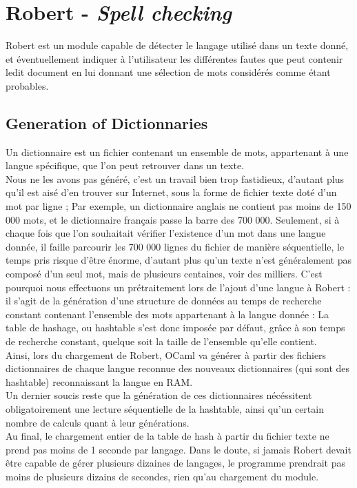 \chapter{Robert - \emph{Spell checking}}

Robert est un module capable de détecter le langage utilisé dans un texte donné, et éventuellement
 indiquer à l'utilisateur les différentes fautes que peut contenir ledit document en lui donnant une
sélection de mots considérés comme étant probables.  

\section{Generation of Dictionnaries}
Un dictionnaire est un fichier contenant un ensemble de mots, appartenant à une langue spécifique,
que l'on peut retrouver dans un texte.\\
Nous ne les avons pas généré, c'est un travail bien trop fastidieux, d'autant plus qu'il est aisé d'en
trouver sur Internet, sous la forme de fichier texte doté d'un mot par ligne ; Par exemple, un dictionnaire
anglais ne contient pas moins de 150 000 mots, et le dictionnaire français passe la barre des 700 000.
Seulement, si à chaque fois que l'on souhaitait vérifier l'existence d'un mot dans une langue donnée, il
faille parcourir les 700 000 lignes du fichier de manière séquentielle, le temps pris risque d'être énorme,
d'autant plus qu'un texte n'est généralement pas composé d'un seul mot, mais de plusieurs centaines, voir des
milliers. C'est pourquoi nous effectuons un prétraitement lors de l'ajout d'une langue à Robert : il s'agit
de la génération d'une structure de données au temps de recherche constant contenant l'ensemble des mots
appartenant à la langue donnée : La table de hashage, ou hashtable s'est donc imposée par défaut, grâce à
son temps de recherche constant, quelque soit la taille de l'ensemble qu'elle contient. \\
Ainsi, lors du chargement de Robert, OCaml va générer à partir des fichiers dictionnaires de chaque langue
reconnue des nouveaux dictionnaires (qui sont des hashtable)  reconnaissant la langue en RAM. \\
Un dernier soucis reste que la génération de ces dictionnaires nécéssitent obligatoirement une lecture
séquentielle de la hashtable, ainsi qu'un certain nombre de calculs quant à leur générations. \\Au final,
le chargement entier de la table de hash à partir du fichier texte ne prend pas moins de 1 seconde par langage.
Dans le doute, si jamais Robert devait être capable de gérer plusieurs dizaines de langages, le programme prendrait
pas moins de plusieurs dizains de secondes, rien qu'au chargement du module.

